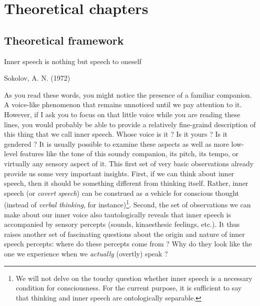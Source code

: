 \documentclass[a4paper,12pt,twoside,openright,oldfontcommands]{memoir}
\let\rmarkdownfootnote\footnote%
\def\footnote{\protect\rmarkdownfootnote}
\newcommand{\initial}[1]{
	\lettrine[lines=3,lhang=0.33,nindent=0em]{
		\color{gray}
     		{\textsc{#1}}}{}}
\begin{document}

\part{Theoretical chapters}\label{part-theoretical-chapters}

\chapter{Theoretical framework}\label{intro}

\epigraph{Inner speech is nothing but speech to oneself}{Sokolov, A. N. (1972)}

\initial{A}s you read these words, you might notice the presence of a
familiar companion. A voice-like phenomenon that remains unnoticed until
we pay attention to it. However, if I ask you to focus on that little
voice while you are reading these lines, you would probably be able to
provide a relatively fine-graind description of this thing that we call
inner speech. Whose voice is it ? Is it yours ? Is it gendered ? It is
usually possible to examine these aspects as well as more low-level
features like the tone of this soundy companion, its pitch, its tempo,
or virtually any sensory aspect of it. This first set of very basic
observations already provide us some very important insights. First, if
we can think about inner speech, then it should be something different
from thinking itself. Rather, inner speech (or \emph{covert speech}) can
be construed as \emph{a} vehicle for conscious thought (instead of
\emph{verbal thinking}, for instance)\footnote{We will not delve on the
  touchy question whether inner speech is a necessary condition for
  consciousness. For the current purpose, it is sufficient to say that
  thinking and inner speech are ontologically separable.}. Second, the
set of observations we can make about our inner voice also
tautologically reveals that inner speech is accompanied by sensory
percepts (sounds, kinaesthesic feelings, etc.). It thus raises another
set of fascinating questions about the origin and nature of inner speech
percepts: where do these percepts come from ? Why do they look like the
one we experience when we \emph{actually} (overtly) speak ?
\end{document}
